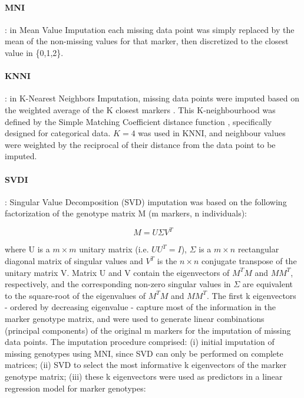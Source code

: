 \paragraph{MNI}
\label{par:MNI}
: in Mean Value Imputation each missing data point was simply replaced by the mean of the non-missing values for that marker, then discretized to the closest value in \{0,1,2\}.
\paragraph{KNNI}
\label{par:KNNI}
: in K-Nearest Neighbors Imputation, missing data points were imputed based on the weighted average of the K closest markers \cite{troyanskaya_missing_2001}. This K-neighbourhood was defined by the Simple Matching Coefficient distance function \cite{schwender_statistical_2007}, specifically designed for categorical data. $K=4$ was used in KNNI, and neighbour values were weighted by the reciprocal of their distance from the data point to be imputed.
\paragraph{SVDI}
\label{par:SVDI}
: Singular Value Decomposition (SVD) imputation was based on the following factorization of the genotype matrix M (m markers, n individuals):

\begin{equation}
\label{eq:SVDI_general}
M = U\Sigma V^{T}
\end{equation}

where U is a $m \times m$ unitary matrix (i.e. $UU^{T}=I$), $\Sigma$ is a $m \times n$ rectangular diagonal matrix of singular values and $V^{T}$ is the $n \times n$ conjugate transpose of the unitary matrix V. Matrix U and V contain the eigenvectors of $M^{T}M$ and $MM^{T}$, respectively, and the corresponding non-zero singular values in $\Sigma$ are equivalent to the square-root of the eigenvalues of $M^{T}M$ and $MM^{T}$. The first k eigenvectors - ordered by decreasing eigenvalue - capture most of the information in the marker genotype matrix, and were used to generate linear combinations (principal components) of the original m markers for the imputation of missing data points. The imputation procedure comprised: (i) initial imputation of missing genotypes using MNI, since SVD can only be performed on complete matrices; (ii) SVD to select the most informative k eigenvectors of the marker genotype matrix; (iii) these k eigenvectors were used as predictors in a linear regression model for marker genotypes:

